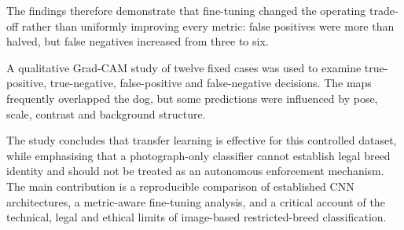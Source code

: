 \documentclass[12pt,a4paper]{report}
\begin{document}
The findings therefore demonstrate that fine-tuning changed the
operating trade-off rather than uniformly improving every
metric: false positives were more than halved, but false
negatives increased from three to six.

A qualitative Grad-CAM study of twelve fixed cases was used to
examine true-positive, true-negative, false-positive and
false-negative decisions. The maps frequently overlapped the
dog, but some predictions were influenced by pose, scale,
contrast and background structure.

The study concludes that transfer learning is effective for this
controlled dataset, while emphasising that a photograph-only
classifier cannot establish legal breed identity and should not
be treated as an autonomous enforcement mechanism. The main
contribution is a reproducible comparison of established CNN
architectures, a metric-aware fine-tuning analysis, and a
critical account of the technical, legal and ethical limits of
image-based restricted-breed classification.



\hypertarget{contentspage}{}
\tableofcontents
\listoffigures
\listoftables

\clearpage














\end{document}
